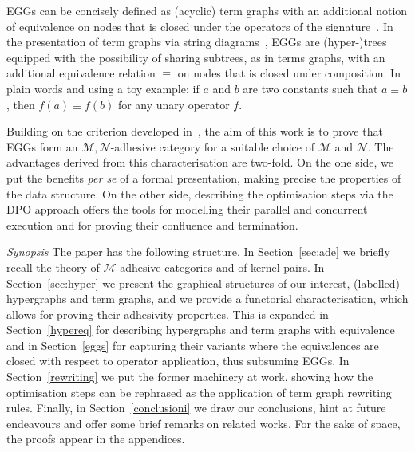 \documentclass[a4paper,UKenglish,cleveref,pdftex,thm-restate,numberwithinsect]{lipics-v2021}
\begin{document}
EGGs can be concisely defined as (acyclic) term graphs with an additional notion of equivalence on nodes
that is closed under the operators of the signature~\cite[Section~4.2]{DetlefsNS05}.
In the presentation of term graphs via string diagrams~\cite{CastelnovoGM24}, EGGs are (hyper-)trees equipped with 
the possibility of sharing subtrees, as in terms graphs, with an additional equivalence relation $\equiv$ on nodes that 
is closed under composition. In plain words and using a toy example:
if $a$ and $b$ are two constants such that $a \equiv b$, then $f(a) \equiv f(b)$ for any unary operator $f$.



Building on the criterion developed in~\cite{CastelnovoGM24}, the aim of this work is to prove that EGGs form an 
$\mathcal{M}, \mathcal{N}$-adhesive category for a suitable choice of $\mathcal{M}$ and $\mathcal{N}$.
The advantages derived from this characterisation are two-fold. On the one side, 
we put the benefits \emph{per se} of a formal presentation, making precise the properties of the data structure. 
On the other side, describing the optimisation steps via the DPO approach
offers the tools for modelling their parallel and concurrent execution
and for proving their confluence and termination.

\emph{Synopsis}
The paper has the following structure. 
In Section~\ref{sec:ade} we briefly recall 
the theory of $\mathcal{M}$-adhesive categories
and of kernel pairs.
In Section~\ref{sec:hyper} we present the graphical structures of our interest, 
 (labelled) hypergraphs and term graphs, and we provide a
functorial characterisation, which allows for proving their adhesivity properties.
This is expanded in Section~\ref{hypereq} for describing hypergraphs 
and term graphs with equivalence and in Section~\ref{eggs} for capturing
their variants where the equivalences are closed with respect to operator application,
thus subsuming EGGs.
%
In Section~\ref{rewriting} we put the former machinery at work, showing how the optimisation steps
can be rephrased as the application of term graph rewriting rules.
%
Finally, in Section~\ref{conclusioni} we draw our conclusions, hint at future endeavours and offer some 
brief remarks on related works.
%
For the sake of space, the proofs appear in the appendices. 
\end{document}
